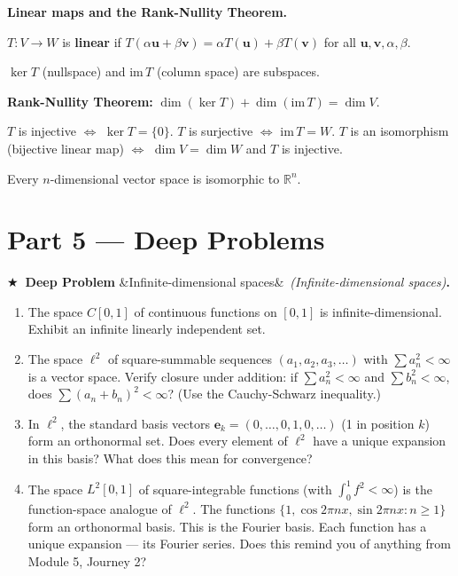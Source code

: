 \documentclass[12pt, a4paper]{article}
\newcounter{problem}
\newcounter{deepproblem}
\newenvironment{deepproblem}[1][]{%
  \refstepcounter{deepproblem}%
  \par\vspace{6pt}%
  \noindent\textbf{\color{NavyBlue}$\bigstar$\ Deep Problem \thedeepproblem}%
  \ifx&#1&\else\ \textit{(#1)}\fi\textbf{.}\enskip
}{\par\vspace{4pt}}
\begin{document}
\begin{namebox}
\textbf{Linear maps and the Rank-Nullity Theorem.}

$T: V \to W$ is \textbf{linear} if $T(\alpha\mathbf{u} + \beta\mathbf{v}) = \alpha T(\mathbf{u}) + \beta T(\mathbf{v})$ for all $\mathbf{u},\mathbf{v},\alpha,\beta$.

$\ker T$ (nullspace) and $\text{im}\,T$ (column space) are subspaces.

\textbf{Rank-Nullity Theorem:} $\dim(\ker T) + \dim(\text{im}\,T) = \dim V$.

$T$ is injective $\iff$ $\ker T = \{0\}$. $T$ is surjective $\iff$ $\text{im}\,T = W$. $T$ is an isomorphism (bijective linear map) $\iff$ $\dim V = \dim W$ and $T$ is injective.

Every $n$-dimensional vector space is isomorphic to $\mathbb{R}^n$.
\end{namebox}

\section{Part 5 \texorpdfstring{---}{--} Deep Problems}

\begin{deepproblem}[Infinite-dimensional spaces]
\begin{enumerate}[label=(\alph*)]
  \item The space $C[0,1]$ of continuous functions on $[0,1]$ is infinite-dimensional. Exhibit an infinite linearly independent set.
  \item The space $\ell^2$ of square-summable sequences $(a_1, a_2, a_3, \ldots)$ with $\sum a_n^2 < \infty$ is a vector space. Verify closure under addition: if $\sum a_n^2 < \infty$ and $\sum b_n^2 < \infty$, does $\sum (a_n + b_n)^2 < \infty$? (Use the Cauchy-Schwarz inequality.)
  \item In $\ell^2$, the standard basis vectors $\mathbf{e}_k = (0,\ldots,0,1,0,\ldots)$ (1 in position $k$) form an orthonormal set. Does every element of $\ell^2$ have a unique expansion in this basis? What does this mean for convergence?
  \item The space $L^2[0,1]$ of square-integrable functions (with $\int_0^1 f^2 < \infty$) is the function-space analogue of $\ell^2$. The functions $\{1, \cos 2\pi nx, \sin 2\pi nx : n \geq 1\}$ form an orthonormal basis. This is the Fourier basis. Each function has a unique expansion --- its Fourier series. Does this remind you of anything from Module 5, Journey 2?
\end{enumerate}
\end{deepproblem}
\end{document}
